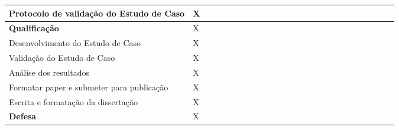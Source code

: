 \begin{table}[h]
\begin{tabular}{l | l | l | l | l | l | l | l | l | l | l | l | l | l | l | l | l | l | l | l | l | l | l | l | l }
Protocolo de validação do Estudo de Caso & X  &   &   &   &   &   &   &   &   &   &   &   &   &   &   &   &  &   &   &  &   \\ \hline

\textbf{Qualificação} & X  &   &   &   &   &   &   &   &   &   &   &   &   &   &   &   &  &   &   &  &   \\ \hline

Desenvolvimento do Estudo de Caso & X  &   &   &   &   &   &   &   &   &   &   &   &   &   &   &   &  &   &   &  &   \\ \hline

Validação do Estudo de Caso & X  &   &   &   &   &   &   &   &   &   &   &   &   &   &   &   &  &   &   &  &   \\ \hline

Análise dos resultados& X  &   &   &   &   &   &   &   &   &   &   &   &   &   &   &   &  &   &   &  &   \\ \hline

Formatar paper e submeter para publicação& X  &   &   &   &   &   &   &   &   &   &   &   &   &   &   &   &  &   &   &  &   \\ \hline

Escrita e formatação da dissertação & X  &   &   &   &   &   &   &   &   &   &   &   &   &   &   &   &  &   &   &  &   \\ \hline

\textbf{Defesa} & X  &   &   &   &   &   &   &   &   &   &   &   &   &   &   &   &  &   &   &  &   \\ \hline
\end{tabular}
\end{table}
